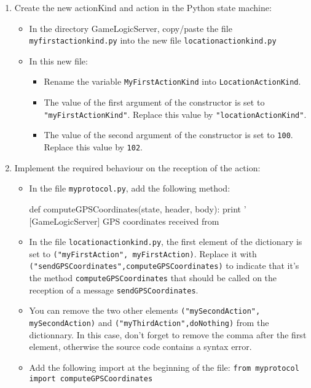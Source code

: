 \begin{enumerate}
\item Create the new \textsf{actionKind} and \textsf{action} in the Python
  state machine:

\begin{itemize}
\item In the directory GameLogicServer, copy/paste the file
  \texttt{myfirstactionkind.py} into the new file
  \texttt{locationactionkind.py}
\item In this new file:
\begin{itemize}
\item Rename the variable \texttt{MyFirstActionKind} into
  \texttt{LocationActionKind}.

\item The value of the first argument of the constructor is set to
  \texttt{"myFirstActionKind"}. Replace this value by
  \texttt{"locationActionKind"}.
\item The value of the second argument of the constructor is set to 
\texttt{100}. Replace this value by \texttt{102}.
\end{itemize}
\end{itemize}

\item Implement the required behaviour on the reception of the \textsf{action}:
\begin{itemize}
\item In the file \texttt{myprotocol.py}, add the following method:
\begin{shellcmd}
def computeGPSCoordinates(state, header, body):
    print ' [GameLogicServer] GPS coordinates received from %
\end{shellcmd}
\item In the file \texttt{locationactionkind.py}, the first element of
  the dictionary is set to \texttt{("myFirstAction", myFirstAction)}.
  Replace it with \texttt{("sendGPSCoordinates",computeGPSCoordinates)}
  to indicate that it's the method \texttt{computeGPSCoordinates} that
  should be called on the reception of a message \texttt{sendGPSCoordinates}.
\item You can remove the two other elements \texttt{("mySecondAction",
  mySecondAction)} and \texttt{("myThirdAction",doNothing)} from the
  dictionnary. In this case, don't forget to remove the comma
  after the first element, otherwise the source code contains a syntax
  error.
\item Add the following import at the beginning of the file: 
\newline
\texttt{from myprotocol import computeGPSCoordinates}
\end{itemize}


\end{enumerate}

